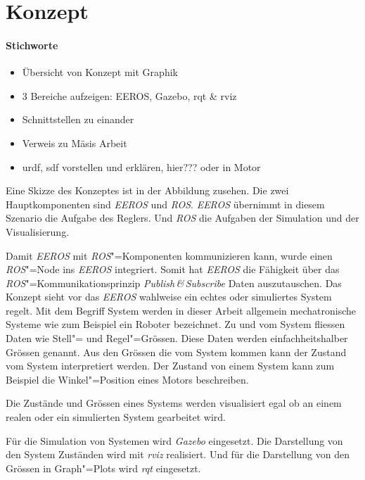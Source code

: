 \chapter{Konzept}
\subsubsection*{Stichworte}
\begin{itemize}
\item Übersicht von Konzept mit Graphik
\item 3 Bereiche aufzeigen: EEROS, Gazebo, rqt \& rviz
\item Schnittstellen zu einander
\item Verweis zu Mäsis Arbeit
\item urdf, sdf vorstellen und erklären, hier??? oder in Motor
\end{itemize}

Eine Skizze des Konzeptes ist in der Abbildung %
zusehen.
Die zwei Hauptkomponenten sind \textit{EEROS} und \textit{ROS}.
\textit{EEROS} übernimmt in diesem Szenario die Aufgabe des Reglers.
Und \textit{ROS} die Aufgaben der Simulation und der Visualisierung.

Damit \textit{EEROS} mit \textit{ROS}"=Komponenten kommunizieren kann, wurde einen \textit{ROS}"=Node ins \textit{EEROS} integriert.
Somit hat \textit{EEROS} die Fähigkeit über das \textit{ROS}"=Kommunikationsprinzip \textit{Publish\,\&\,Subscribe} Daten auszutauschen.
Das Konzept sieht vor das \textit{EEROS} wahlweise ein echtes oder simuliertes System regelt.
Mit dem Begriff System werden in dieser Arbeit allgemein mechatronische Systeme wie zum Beispiel ein Roboter bezeichnet.
Zu und vom System fliessen Daten wie Stell"= und Regel"=Grössen.
Diese Daten werden einfachheitshalber Grössen genannt.
Aus den Grössen die vom System kommen kann der Zustand vom System interpretiert werden.
Der Zustand von einem System kann zum Beispiel die Winkel"=Position eines Motors beschreiben.

Die Zustände und Grössen eines Systems werden visualisiert egal ob an einem realen oder ein simulierten System gearbeitet wird. %

Für die Simulation von Systemen wird \textit{Gazebo} eingesetzt.
Die Darstellung von den System Zuständen wird mit \textit{rviz} realisiert. Und für die Darstellung von den Grössen in Graph"=Plots wird \textit{rqt} eingesetzt.

